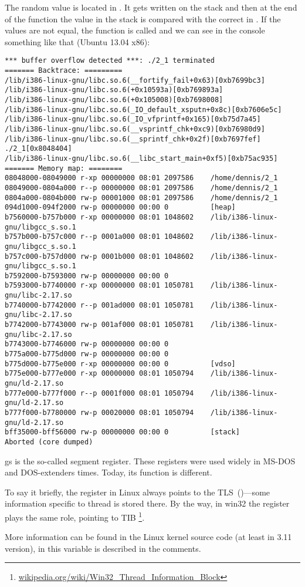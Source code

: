 The random value is located in . 
It gets written on the stack and then at the end of the function
the value in the stack is compared with the correct  in . 
If the values are not equal, the 
function is called and we can see in the console something like that (Ubuntu 13.04 x86):

\begin{lstlisting}
*** buffer overflow detected ***: ./2_1 terminated
======= Backtrace: =========
/lib/i386-linux-gnu/libc.so.6(__fortify_fail+0x63)[0xb7699bc3]
/lib/i386-linux-gnu/libc.so.6(+0x10593a)[0xb769893a]
/lib/i386-linux-gnu/libc.so.6(+0x105008)[0xb7698008]
/lib/i386-linux-gnu/libc.so.6(_IO_default_xsputn+0x8c)[0xb7606e5c]
/lib/i386-linux-gnu/libc.so.6(_IO_vfprintf+0x165)[0xb75d7a45]
/lib/i386-linux-gnu/libc.so.6(__vsprintf_chk+0xc9)[0xb76980d9]
/lib/i386-linux-gnu/libc.so.6(__sprintf_chk+0x2f)[0xb7697fef]
./2_1[0x8048404]
/lib/i386-linux-gnu/libc.so.6(__libc_start_main+0xf5)[0xb75ac935]
======= Memory map: ========
08048000-08049000 r-xp 00000000 08:01 2097586    /home/dennis/2_1
08049000-0804a000 r--p 00000000 08:01 2097586    /home/dennis/2_1
0804a000-0804b000 rw-p 00001000 08:01 2097586    /home/dennis/2_1
094d1000-094f2000 rw-p 00000000 00:00 0          [heap]
b7560000-b757b000 r-xp 00000000 08:01 1048602    /lib/i386-linux-gnu/libgcc_s.so.1
b757b000-b757c000 r--p 0001a000 08:01 1048602    /lib/i386-linux-gnu/libgcc_s.so.1
b757c000-b757d000 rw-p 0001b000 08:01 1048602    /lib/i386-linux-gnu/libgcc_s.so.1
b7592000-b7593000 rw-p 00000000 00:00 0
b7593000-b7740000 r-xp 00000000 08:01 1050781    /lib/i386-linux-gnu/libc-2.17.so
b7740000-b7742000 r--p 001ad000 08:01 1050781    /lib/i386-linux-gnu/libc-2.17.so
b7742000-b7743000 rw-p 001af000 08:01 1050781    /lib/i386-linux-gnu/libc-2.17.so
b7743000-b7746000 rw-p 00000000 00:00 0
b775a000-b775d000 rw-p 00000000 00:00 0
b775d000-b775e000 r-xp 00000000 00:00 0          [vdso]
b775e000-b777e000 r-xp 00000000 08:01 1050794    /lib/i386-linux-gnu/ld-2.17.so
b777e000-b777f000 r--p 0001f000 08:01 1050794    /lib/i386-linux-gnu/ld-2.17.so
b777f000-b7780000 rw-p 00020000 08:01 1050794    /lib/i386-linux-gnu/ld-2.17.so
bff35000-bff56000 rw-p 00000000 00:00 0          [stack]
Aborted (core dumped)
\end{lstlisting}

gs is the so-called segment register. These registers were used widely in MS-DOS and DOS-extenders
times.
Today, its function is different.

To say it briefly, the  register in Linux always points to the
\ac{TLS}~()---some information specific to thread is stored there.
By the way, in win32 the  register plays the same role, pointing to
\ac{TIB} \footnote{\href{http://go.yurichev.com/17104}{wikipedia.org/wiki/Win32\_Thread\_Information\_Block}}. 

More information can be found in the Linux kernel source code (at least in 3.11 version), in
 this variable is described in the comments.



